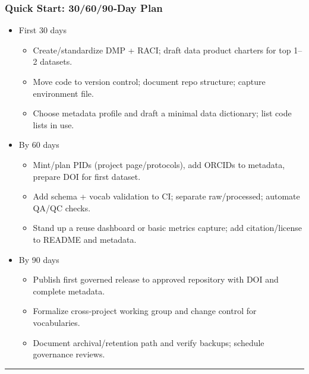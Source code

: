 \documentclass[
  letterpaper,
  DIV=11,
  numbers=noendperiod]{scrartcl}
\providecommand{\tightlist}{%
  \setlength{\itemsep}{0pt}\setlength{\parskip}{0pt}}
\begin{document}
\subsubsection{Quick Start: 30/60/90‑Day
Plan}\label{quick-start-306090day-plan}

\begin{itemize}
\tightlist
\item
  First 30 days

  \begin{itemize}
  \tightlist
  \item[$\square$]
    Create/standardize DMP + RACI; draft data product charters for top
    1--2 datasets.
  \item[$\square$]
    Move code to version control; document repo structure; capture
    environment file.
  \item[$\square$]
    Choose metadata profile and draft a minimal data dictionary; list
    code lists in use.
  \end{itemize}
\item
  By 60 days

  \begin{itemize}
  \tightlist
  \item[$\square$]
    Mint/plan PIDs (project page/protocols), add ORCIDs to metadata,
    prepare DOI for first dataset.
  \item[$\square$]
    Add schema + vocab validation to CI; separate raw/processed;
    automate QA/QC checks.
  \item[$\square$]
    Stand up a reuse dashboard or basic metrics capture; add
    citation/license to README and metadata.
  \end{itemize}
\item
  By 90 days

  \begin{itemize}
  \tightlist
  \item[$\square$]
    Publish first governed release to approved repository with DOI and
    complete metadata.
  \item[$\square$]
    Formalize cross‑project working group and change control for
    vocabularies.
  \item[$\square$]
    Document archival/retention path and verify backups; schedule
    governance reviews.
  \end{itemize}
\end{itemize}

\begin{center}\rule{0.5\linewidth}{0.5pt}\end{center}
\end{document}

